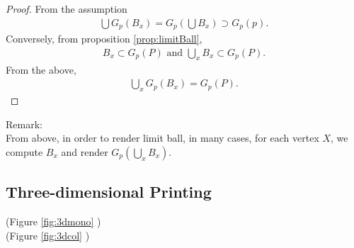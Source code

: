 \documentclass[suppldata, dvipdfmx]{interact}
\theoremstyle{plain}%
\theoremstyle{definition}
\theoremstyle{remark}
\theoremstyle{problemstyle}
\begin{document}
\begin{proof}
 From the assumption 
 \begin{align*}
  \bigcup G_p(B_x) = G_p (\bigcup B_x) \supset G_p(p).
 \end{align*}
 Conversely, from proposition \ref{prop:limitBall},
 \begin{align*}
  B_x \subset G_p(P) \text{ and } \displaystyle\bigcup_{x} B_x \subset G_p(P)\text{.}
 \end{align*}
 From the above,
\begin{align*}
 \displaystyle\bigcup_x G_p(B_x) = G_p(P).
\end{align*}
\end{proof}
\noindent Remark: \\
From above, in order to render limit ball,
in many cases, for each vertex $X$, we compute $B_x$ and render
$G_p(\displaystyle\bigcup_x B_x)$.


\subsection{Three-dimensional Printing}

\noindent(Figure \ref{fig:3dmono}
)\\
(Figure \ref{fig:3dcol}
)
\end{document}
